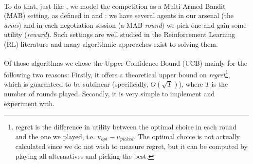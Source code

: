 \documentclass[12pt]{article}
\numberwithin{equation}{section}
\begin{document}
			\paragraph*{}
				To do that, just like \cite{meta_agent_paper}, we model the competition as a Multi-Armed Bandit (MAB) setting, as defined in \cite{MAB_Lai_Robbins_1985} and \cite{MAB_paper_2002}: we have several agents in our arsenal (the \emph{arms}) and in each negotiation session (a MAB \emph{round}) we pick one and gain some utility (\emph{reward}). Such settings are well studied in the Reinforcement Learning (RL) literature and many algorithmic approaches exist to solving them. %

			\paragraph*{}
				Of those algorithms we chose the Upper Confidence Bound (UCB) \cite{UCB_paper} mainly for the following two reasons: Firstly, it offers a theoretical upper bound  on \emph{regret}\footnote{regret is the difference in utility between the optimal choice in each round and the one we played, i.e. $u_{opt} - u_{picked}$. The optimal choice is not actually calculated since we do not wish to measure regret, but it can be computed by playing all alternatives and picking the best.}, which is guaranteed to be sublinear (specifically, $O(\sqrt{T})$), where $T$ is the number of rounds played. Secondly, it is very simple to implement and experiment with. %
			
\end{document}
